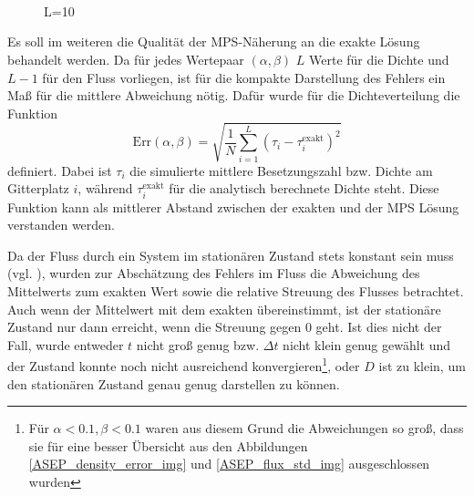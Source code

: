 \documentclass[10pt,a4paper]{report}
\begin{document}
\begin{figure}
\centering
{}
\subfloat[$\text{Err}(\alpha,\beta)$ für ($D=3$)]{\texttt{[image: Julia/Data/Err\_D=3.png]}\label{ASEP_density_error:2_img}}\\
\subfloat[Fehler des Flusses ($D=3$)]{\texttt{[image: Julia/Data/flow\_error\_D=3.png]}\label{ASEP_flux_error:2_img}}\\
\subfloat[relative Streuung des Flusses ($D=3$)]{\texttt{[image: Julia/Data/flow\_std\_D=3.png]}\label{ASEP_flux_std:2_img}}\\
\label{ASEP_error_img}
\caption{L=10}
\end{figure}

Es soll im weiteren die Qualität der MPS-Näherung an die exakte Lösung behandelt werden. Da für jedes Wertepaar $(\alpha,\beta)$ $L$ Werte für die Dichte und $L-1$ für den Fluss vorliegen, ist für die kompakte Darstellung des Fehlers ein Maß für die mittlere Abweichung nötig. Dafür wurde für die Dichteverteilung die Funktion
\begin{equation}
\text{Err}(\alpha,\beta)=\sqrt{\frac{1}{N}\sum_{i=1}^L (\tau_i-\tau_i^{\text{exakt}})^2}
\end{equation}
definiert. Dabei ist $\tau_i$ die simulierte mittlere Besetzungszahl bzw. Dichte am Gitterplatz $i$, während $\tau_i^{\text{exakt}}$ für die analytisch berechnete Dichte steht. Diese Funktion kann als mittlerer Abstand zwischen der exakten und der MPS Lösung verstanden werden.

Da der Fluss durch ein System im stationären Zustand stets konstant sein muss (vgl. \cite{ASEP}), wurden zur Abschätzung des Fehlers im Fluss die Abweichung des Mittelwerts zum exakten Wert sowie die relative Streuung des Flusses betrachtet. Auch wenn der Mittelwert mit dem exakten übereinstimmt, ist der stationäre Zustand nur dann erreicht, wenn die Streuung gegen $0$ geht. Ist dies nicht der Fall, wurde entweder $t$ nicht groß genug bzw. $\Delta t$ nicht klein genug gewählt und der Zustand konnte noch nicht ausreichend konvergieren\footnote{Für $\alpha<0.1,\beta<0.1$ waren aus diesem Grund die Abweichungen so groß, dass sie für eine besser Übersicht aus den Abbildungen \ref{ASEP_density_error_img} und \ref{ASEP_flux_std_img} ausgeschlossen wurden}, oder $D$ ist zu klein, um den stationären Zustand genau genug darstellen zu können.\\
\end{document}
